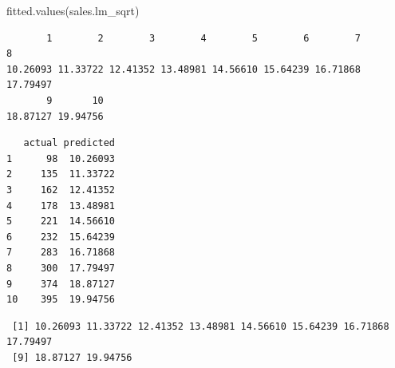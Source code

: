 \documentclass[
  letterpaper,
  DIV=11,
  numbers=noendperiod]{scrartcl}
\newenvironment{Shaded}{\begin{snugshade}}{\end{snugshade}}
\newcommand{\AttributeTok}[1]{\textcolor[rgb]{0.40,0.45,0.13}{#1}}
\newcommand{\FunctionTok}[1]{\textcolor[rgb]{0.28,0.35,0.67}{#1}}
\newcommand{\NormalTok}[1]{\textcolor[rgb]{0.00,0.23,0.31}{#1}}
\newcommand{\OtherTok}[1]{\textcolor[rgb]{0.00,0.23,0.31}{#1}}
\newcommand{\SpecialCharTok}[1]{\textcolor[rgb]{0.37,0.37,0.37}{#1}}
\begin{document}
\begin{Shaded}
\begin{Highlighting}[]
\FunctionTok{fitted.values}\NormalTok{(sales.lm\_sqrt)}
\end{Highlighting}
\end{Shaded}

\begin{verbatim}
       1        2        3        4        5        6        7        8 
10.26093 11.33722 12.41352 13.48981 14.56610 15.64239 16.71868 17.79497 
       9       10 
18.87127 19.94756 
\end{verbatim}

\begin{Shaded}
\end{Shaded}

\begin{verbatim}
   actual predicted
1      98  10.26093
2     135  11.33722
3     162  12.41352
4     178  13.48981
5     221  14.56610
6     232  15.64239
7     283  16.71868
8     300  17.79497
9     374  18.87127
10    395  19.94756
\end{verbatim}

\begin{Shaded}
\end{Shaded}

\begin{Shaded}
\end{Shaded}

\begin{verbatim}
 [1] 10.26093 11.33722 12.41352 13.48981 14.56610 15.64239 16.71868 17.79497
 [9] 18.87127 19.94756
\end{verbatim}

\begin{Shaded}
\end{Shaded}
\end{document}
